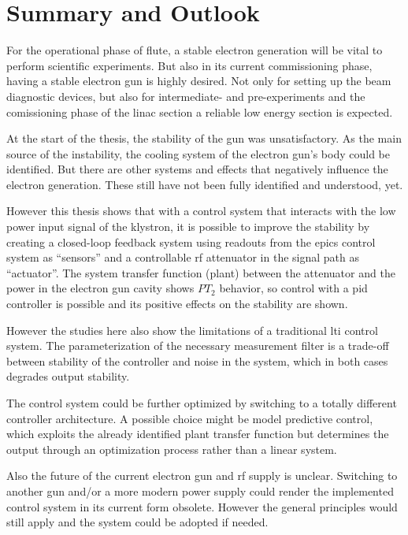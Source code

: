 \chapter{Summary and Outlook}
For the operational phase of \gls{flute}, a stable electron generation will be vital to perform scientific experiments. But also in its current commissioning phase, having a stable electron gun is highly desired. Not only for setting up the beam diagnostic devices, but also for intermediate- and pre-experiments and the comissioning phase of the \gls{linac} section a reliable low energy section is expected.

At the start of the thesis, the stability of the gun was unsatisfactory. As the main source of the instability, the cooling system of the electron gun's body could be identified. But there are other systems and effects that negatively influence the electron generation. These still have not been fully identified and understood, yet.

However this thesis shows that with a control system that interacts with the low power input signal of the klystron, it is possible to improve the stability by creating a closed-loop feedback system using readouts from the \gls{epics} control system as ``sensors'' and a controllable \gls{rf} attenuator in the signal path as ``actuator''. The system transfer function (plant) between the attenuator and the power in the electron gun cavity shows $PT_2$ behavior, so control with a \gls{pid} controller is possible and its positive effects on the stability are shown.

However the studies here also show the limitations of a traditional \gls{lti} control system. The parameterization of the necessary measurement filter is a trade-off between stability of the controller and noise in the system, which in both cases degrades output stability.

The control system could be further optimized by switching to a totally different controller architecture. A possible choice might be model predictive control, which exploits the already identified plant transfer function but determines the output through an optimization process rather than a linear system.

Also the future of the current electron gun and \gls{rf} supply is unclear. Switching to another gun and/or a more modern power supply could render the implemented control system in its current form obsolete. However the general principles would still apply and the system could be adopted if needed.